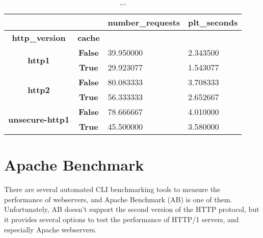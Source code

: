 \documentclass[a4paper,10pt]{article}
\begin{document}
\begin{table}[h!]
\centering
\begin{tabular}{|c|c|l|l|}
\hline
\multicolumn{1}{|r|}{\textbf{}}          & \multicolumn{1}{r|}{\textbf{}} & \multicolumn{1}{r|}{\textbf{number\_requests}} & \multicolumn{1}{r|}{\textbf{plt\_seconds}} \\ \hline
\textbf{http\_version}                   & \textbf{cache}                 & \multicolumn{1}{c|}{\textbf{}}                 & \multicolumn{1}{c|}{\textbf{}}             \\ \hline
\multirow{2}{*}{\textbf{http1}}          & \textbf{False}                 & 39.950000                                      & 2.343500                                   \\ \cline{2-4} 
                                         & \textbf{True}                  & 29.923077                                      & 1.543077                                   \\ \hline
\multirow{2}{*}{\textbf{http2}}          & \textbf{False}                 & 80.083333                                      & 3.708333                                   \\ \cline{2-4} 
                                         & \textbf{True}                  & 56.333333                                      & 2.652667                                   \\ \hline
\multirow{2}{*}{\textbf{unsecure-http1}} & \textbf{False}                 & 78.666667                                      & 4.010000                                   \\ \cline{2-4} 
                                         & \textbf{True}                  & 45.500000                                      & 3.580000                                   \\ \hline
\end{tabular}

\caption{...}
\label{fig:table2}
\end{table}





\section{Apache Benchmark}

There are several automated CLI benchmarking tools to measure the performance of webservers, and Apache Benchmark (AB) is one of them. Unfortunately, AB doesn't support the second version of the HTTP protocol, but it provides several options to test the performance of HTTP/1 servers, and especially Apache webservers.
\end{document}

